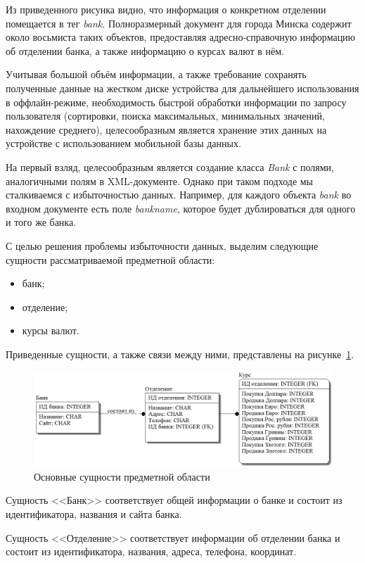 Из приведенного рисунка видно, что информация о конкретном отделении
помещается в тег \textit{bank}. Полноразмерный документ для города Минска
содержит около восьмиста таких объектов, предоставляя адресно-справочную
информацию об отделении банка, а также информацию о курсах валют в нём.

Учитывая большой объём информации, а также требование сохранять полученные данные
на жестком диске устройства для дальнейшего использования в оффлайн-режиме,
необходимость быстрой обработки информации по запросу пользователя
(сортировки, поиска максимальных, минимальных значений, нахождение среднего),
целесообразным является хранение этих данных на устройстве с использованием
мобильной базы данных.

На первый взляд, целесообразным является создание класса \textit{Bank} с полями,
аналогичными полям в XML-документе. Однако при таком подходе мы сталкиваемся с
избыточностью данных. Например, для каждого объекта \textit{bank} во входном
документе есть поле \textit{bankname}, которое будет дублироваться для одного
и того же банка.

С целью решения проблемы избыточности данных, выделим следующие сущности
рассматриваемой предметной области:
\begin{itemize}
  \item банк;
  \item отделение;
  \item курсы валют.
\end{itemize}

Приведенные сущности, а также связи между ними, представлены
на рисунке~\ref{fig:entities}.
\begin{figure}[h!]
  \centering
  \includegraphics[width=150mm]{fig/entities}
  \caption{Основные сущности предметной области}
  \label{fig:entities}
\end{figure}

Сущность <<Банк>> соответствует общей информации о банке
и состоит из идентификатора, названия и сайта банка.

Сущность <<Отделение>> соответствует информации об отделении банка
и состоит из идентификатора, названия, адреса, телефона, координат.

